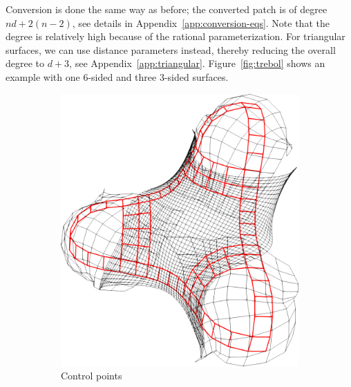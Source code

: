 \documentclass[9pt,academicons]{article}
\begin{document}
Conversion is done the same way as before; the converted patch is of degree $nd+2(n-2)$,
see details in Appendix~\ref{app:conversion-eqs}.
Note that the degree is relatively high because of the rational parameterization.
For triangular surfaces, we can use distance parameters instead,
thereby reducing the overall degree to $d+3$, see Appendix~\ref{app:triangular}.
Figure~\ref{fig:trebol} shows an example with one 6-sided and three 3-sided surfaces.
\begin{figure}
  \begin{subfigure}{.24\textwidth}
    \centering
    \includegraphics[height=.2\textheight]{images/trebol3-cnet.png}
    \caption{Control points}
    \label{fig:trebol-cnet}
  \end{subfigure}
  \hfill
  \begin{subfigure}{.24\textwidth}
    \centering

\end{subfigure}
\end{figure}
\end{document}
